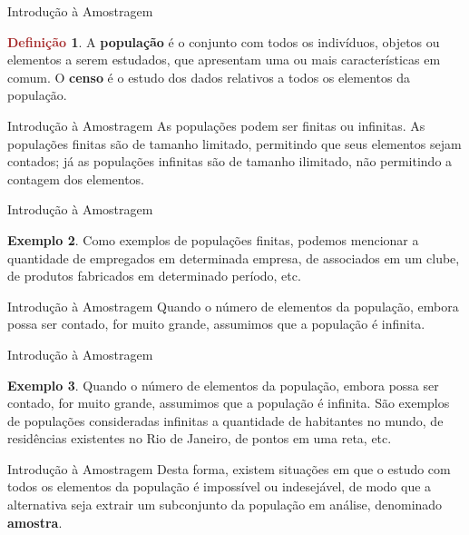 \documentclass[10pt]{beamer}
\renewcommand{\indent}{\hspace*{2em}}
\theoremstyle{definition}
\newtheorem{defn}{\textcolor{brown}{Definição}}[section]
\newtheorem{ex}[defn]{\textcolor{strpink}{Exemplo}}
\begin{document}
\begin{frame}{Introdução à Amostragem}
\begin{defn}
\vfill\indent A \textbf{população} é o conjunto com todos os indivíduos, objetos ou elementos a serem estudados, que apresentam uma ou mais características em comum. O \textbf{censo} é o estudo dos dados relativos a todos os elementos da população.
\end{defn}
\end{frame}

\begin{frame}{Introdução à Amostragem}
\indent As populações podem ser finitas ou infinitas. As populações finitas são de tamanho limitado, permitindo que seus elementos sejam contados; já as populações infinitas são de tamanho ilimitado, não permitindo a contagem dos elementos.
\end{frame}

\begin{frame}{Introdução à Amostragem}
\begin{ex}
\vfill\indent Como exemplos de populações finitas, podemos mencionar a quantidade de empregados em determinada empresa, de associados em um clube, de produtos fabricados em determinado período, etc. 
\end{ex}
\end{frame}

\begin{frame}{Introdução à Amostragem}
\indent Quando o número de elementos da população, embora possa ser contado, for muito grande, assumimos que a população é infinita.
\end{frame}

\begin{frame}{Introdução à Amostragem}
\begin{ex}
\vfill\indent Quando o número de
elementos da população, embora possa ser contado, for muito grande, assumimos que a população é infinita. São exemplos de populações consideradas infinitas a quantidade de habitantes no mundo, de residências existentes no Rio de Janeiro, de pontos em uma reta, etc.
\end{ex}
\end{frame}

\begin{frame}{Introdução à Amostragem}
\indent Desta forma, existem situações em que o estudo com todos os elementos da população é impossível ou indesejável, de modo que a alternativa seja extrair um subconjunto da população em análise, denominado \textbf{amostra}.
\end{frame}
\end{document}
